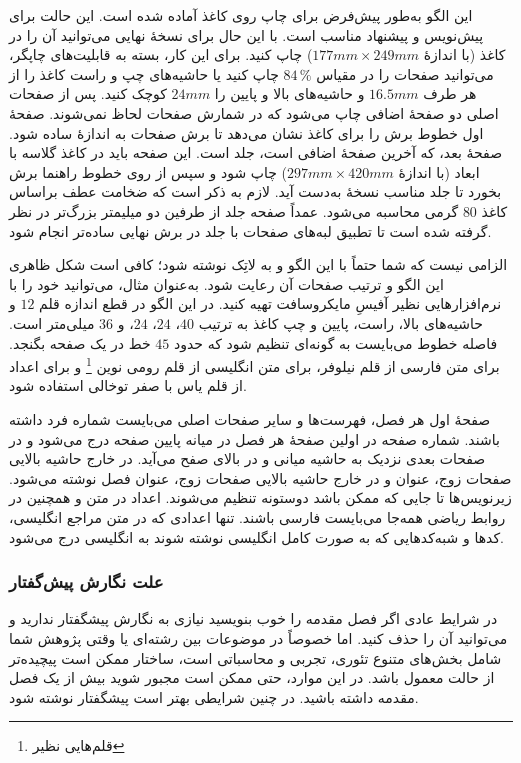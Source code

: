 این الگو به‌طور پیش‌فرض برای چاپ روی کاغذ 
آماده شده است. این حالت برای پیش‌نویس و پیشنهاد
\thesis 
مناسب است. با این حال برای نسخهٔ نهایی 
\thesis 
می‌توانید آن را در کاغذ 
(با اندازهٔ  
$177\unit{mm} \times 249\unit{mm}$) 
چاپ کنید. برای این کار، بسته به قابلیت‌های چاپگر، می‌توانید صفحات را در مقیاس 
$84\,\%$ 
چاپ کنید یا حاشیه‌های چپ و راست کاغذ 
را از هر طرف 
$16.5\unit{mm}$ 
و حاشیه‌های بالا و پایین را 
$24\unit{mm}$ 
کوچک کنید. پس از صفحات اصلی 
\thesis 
دو صفحهٔ اضافی چاپ می‌شود که در شمارش صفحات لحاظ نمی‌شوند. صفحهٔ اول خطوط برش را برای کاغذ 
نشان می‌دهد تا برش صفحات به اندازهٔ 
ساده شود. صفحهٔ بعد، که آخرین صفحهٔ اضافی است، جلد است. این صفحه باید در کاغذ گلاسه با ابعاد 
(با اندازهٔ 
$297\unit{mm} \times 420\unit{mm}$) 
چاپ شود و سپس از روی خطوط راهنما برش بخورد تا جلد مناسب نسخهٔ
به‌دست آید. لازم به ذکر است که ضخامت عطف براساس کاغذ $80$ گرمی محاسبه می‌شود. عمداً صفحه جلد از طرفین دو میلیمتر بزرگ‌تر در نظر گرفته شده است تا تطبیق لبه‌های صفحات با جلد در برش نهایی ساده‌تر انجام شود.

الزامی نیست که 
\thesis 
شما حتماً با این الگو و به لاتِک نوشته شود؛ کافی است شکل ظاهری این الگو و ترتیب صفحات آن رعایت شود. به‌عنوان مثال، می‌توانید 
خود را با نرم‌افزارهایی نظیر آفیسِ مایکروسافت تهیه کنید. در این الگو در قطع 
اندازه قلم $12$ و حاشیه‌های بالا، راست، پایین و چپ کاغذ به ترتیب 
$40$، $24$، $24$، و $36$ میلی‌متر است. فاصله خطوط می‌بایست به گونه‌ای تنظیم شود که حدود $45$ خط در یک صفحه بگنجد. برای متن فارسی از قلم نیلوفر، برای متن انگلیسی از قلم رومی نوین%
\footnote{قلم‌هایی نظیر } 
و برای اعداد از قلم یاس با صفر توخالی استفاده شود.

صفحهٔ اول هر فصل، فهرست‌ها و سایر صفحات اصلی می‌بایست شماره فرد داشته باشند. شماره صفحه در اولین صفحهٔ هر فصل در میانه پایین صفحه درج می‌شود و در صفحات بعدی نزدیک به حاشیه میانی و در بالای صفح می‌آید. در خارج حاشیه بالایی صفحات زوج، عنوان 
\thesis 
و در خارج حاشیه بالایی صفحات زوج، عنوان فصل نوشته می‌شود. زیرنویس‌ها تا جایی که ممکن باشد دوستونه تنظیم می‌شوند. اعداد در متن 
\thesis 
و همچنین در روابط ریاضی همه‌جا می‌بایست فارسی باشند. تنها اعدادی که در متن مراجع انگلیسی، کدها و شبه‌کدهایی که به صورت کامل انگلیسی نوشته شوند به انگلیسی درج می‌شود.


\subsubsection{علت نگارش پیش‌گفتار}
در شرایط عادی اگر فصل مقدمه را خوب بنویسید نیازی به نگارش پیشگفتار ندارید و می‌توانید آن را حذف کنید. اما خصوصاً در موضوعات بین رشته‌ای یا وقتی پژوهش شما شامل بخش‌های متنوع تئوری، تجربی و محاسباتی است، ساختار 
\thesis 
ممکن است پیچیده‌تر از حالت معمول باشد. در این موارد، حتی ممکن است مجبور شوید بیش از یک فصل مقدمه داشته باشید. در چنین شرایطی بهتر است پیشگفتار نوشته شود. 

